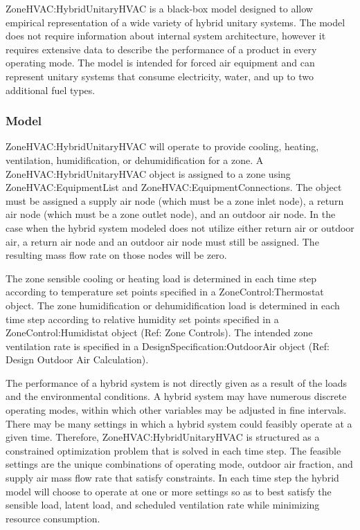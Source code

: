 ZoneHVAC:HybridUnitaryHVAC is a black-box model designed to allow empirical representation of a wide variety of hybrid unitary systems. The model does not require information about internal system architecture, however it requires extensive data to describe the performance of a product in every operating mode. The model is intended for forced air equipment and can represent unitary systems that consume electricity, water, and up to two additional fuel types.

\subsubsection{Model}
ZoneHVAC:HybridUnitaryHVAC will operate to provide cooling, heating, ventilation, humidification, or dehumidification for a zone. A ZoneHVAC:HybridUnitaryHVAC object is assigned to a zone using ZoneHVAC:EquipmentList and ZoneHVAC:EquipmentConnections. The object must be assigned a supply air node (which must be a zone inlet node), a return air node (which must be a zone outlet node), and an outdoor air node. In the case when the hybrid system modeled does not utilize either return air or outdoor air, a return air node and an outdoor air node must still be assigned. The resulting mass flow rate on those nodes will be zero.

The zone sensible cooling or heating load is determined in each time step according to temperature set points specified in a ZoneControl:Thermostat object. The zone humidification or dehumidification load is determined in each time step according to relative humidity set points specified in a ZoneControl:Humidistat object (Ref: Zone Controls). The intended zone ventilation rate is specified in a DesignSpecification:OutdoorAir object (Ref: Design Outdoor Air Calculation).

The performance of a hybrid system is not directly given as a result of the loads and the environmental conditions. A hybrid system may have numerous discrete operating modes, within which other variables may be adjusted in fine intervals. There may be many settings in which a hybrid system could feasibly operate at a given time. Therefore, ZoneHVAC:HybridUnitaryHVAC is structured as a constrained optimization problem that is solved in each time step. The feasible settings are the unique combinations of operating mode, outdoor air fraction, and supply air mass flow rate that satisfy constraints. In each time step the hybrid model will choose to operate at one or more settings so as to best satisfy the sensible load, latent load, and scheduled ventilation rate while minimizing resource consumption.

